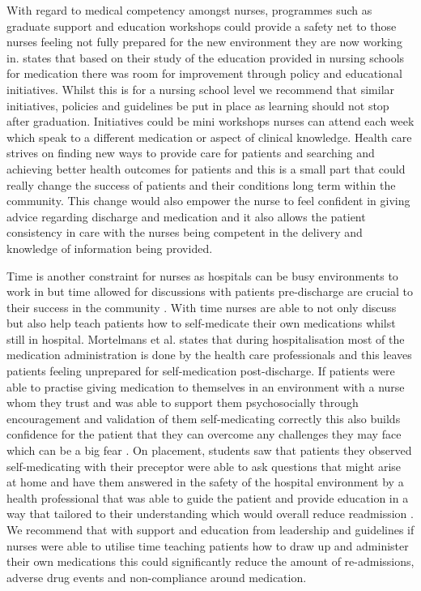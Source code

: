 \documentclass[british,12pt,a4paper]{article}
\begin{document}
	With regard to medical competency amongst nurses, programmes such as graduate support and education workshops could provide a safety net to those nurses feeling not fully prepared for the new environment they are now working in. \citeauthor{Sulosaari2014} states that based on their study of the education provided in nursing schools for medication there was room for improvement through policy and educational initiatives. Whilst this is for a nursing school level we recommend that similar initiatives, policies and guidelines be put in place as learning should not stop after graduation. Initiatives could be mini workshops nurses can attend each week which speak to a different medication or aspect of clinical knowledge. Health care strives on finding new ways to provide care for patients and searching and achieving better health outcomes for patients and this is a small part that could really change the success of patients and their conditions long term within the community. This change would also empower the nurse to feel confident in giving advice regarding discharge and medication and it also allows the patient consistency in care with the nurses being competent in the delivery and knowledge of information being provided.
 
	Time is another constraint for nurses as hospitals can be busy environments to work in but time allowed for discussions with patients pre-discharge are crucial to their success in the community \parencite{Sanjai2019}. With time nurses are able to not only discuss but also help teach patients how to self-medicate their own medications whilst still in hospital. Mortelmans et al. \citeauthor{Mortelmans2021} states that during hospitalisation most of the medication administration is done by the health care professionals and this leaves patients feeling unprepared for self-medication post-discharge. If patients were able to practise giving medication to themselves in an environment with a nurse whom they trust and was able to support them psychosocially through encouragement and validation of them self-medicating correctly this also builds confidence for the patient that they can overcome any challenges they may face which can be a big fear \parencite{Sanjai2019}. On placement, students saw that patients they observed self-medicating with their preceptor were able to ask questions that might arise at home and have them answered in the safety of the hospital environment by a health professional that was able to guide the patient and provide education in a way that tailored to their understanding which would overall reduce readmission \parencite{Sanjai2019}. We recommend that with support and education from leadership and guidelines if nurses were able to utilise time teaching patients how to draw up and administer their own medications this could significantly reduce the amount of re-admissions, adverse drug events and non-compliance around medication.
\end{document}

